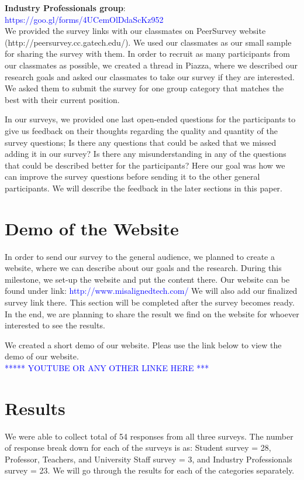 \documentclass{sigchi}
\begin{document}
\textbf{Industry Professionals group}:\\  \textcolor{blue}{https://goo.gl/forms/4UCemOlDdaScKz952}\\

We provided the survey links with our classmates on PeerSurvey website (http://peersurvey.cc.gatech.edu/). We used our classmates as our small sample for sharing the survey with them. In order to recruit as many participants from our classmates as possible, we created a thread in Piazza, where we described our research goals and asked our classmates to take our survey if they are interested. We asked them to submit the survey for one group category that matches the best with their current position. 

In our surveys, we provided one last open-ended questions for the participants to give us feedback on their thoughts regarding the quality and quantity of the survey questions; Is there any questions that could be asked that we missed adding it in our survey? Is there any misunderstanding in any of the questions that could be described better for the participants? Here our goal was how we can improve the survey questions before sending it to the other general participants. We will describe the feedback in the later sections in this paper.

\section{Demo of the Website}
In order to send our survey to the general audience, we planned to create a website, where we can describe about our goals and the research. During this milestone, we set-up the website and put the content there. Our website can be found under link: \textcolor{blue}{http://www.misalignedtech.com/}
We will also add our finalized survey link there. This section will be completed after the survey becomes ready. In the end, we are planning to share the result we find on the website for whoever interested to see the results. 

We created a short demo of our website. Pleas use the link below to view the demo of our website.\\
\textcolor{blue}{***** YOUTUBE OR ANY OTHER LINKE HERE ***}

\section{Results}
We were able to collect total of 54 responses from all three surveys. The number of response break down for each of the surveys is as: Student survey = 28, Professor, Teachers, and University Staff survey = 3, and Industry Professionals survey = 23.
We will go through the results for each of the categories separately.
\end{document}
